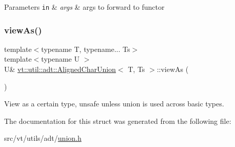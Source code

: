 \begin{DoxyParams}[1]{Parameters}
\mbox{\tt in}  & {\em args} & args to forward to functor \\
\hline
\end{DoxyParams}
\mbox{\label{structvt_1_1util_1_1adt_1_1_aligned_char_union_af9bd3e00a355dca08d88103852f716ce}} 
\subsubsection{\texorpdfstring{view\+As()}{viewAs()}}
{\footnotesize\ttfamily template$<$typename T, typename... Ts$>$ \\
template$<$typename U $>$ \\
U\& \hyperlink{structvt_1_1util_1_1adt_1_1_aligned_char_union}{vt\+::util\+::adt\+::\+Aligned\+Char\+Union}$<$ T, Ts $>$\+::view\+As (\begin{DoxyParamCaption}{ }\end{DoxyParamCaption})\hspace{0.3cm}{\ttfamily [inline]}}



View as a certain type, unsafe unless union is used across basic types. 



The documentation for this struct was generated from the following file\+:\begin{DoxyCompactItemize}
\item 
src/vt/utils/adt/\hyperlink{union_8h}{union.\+h}\end{DoxyCompactItemize}
